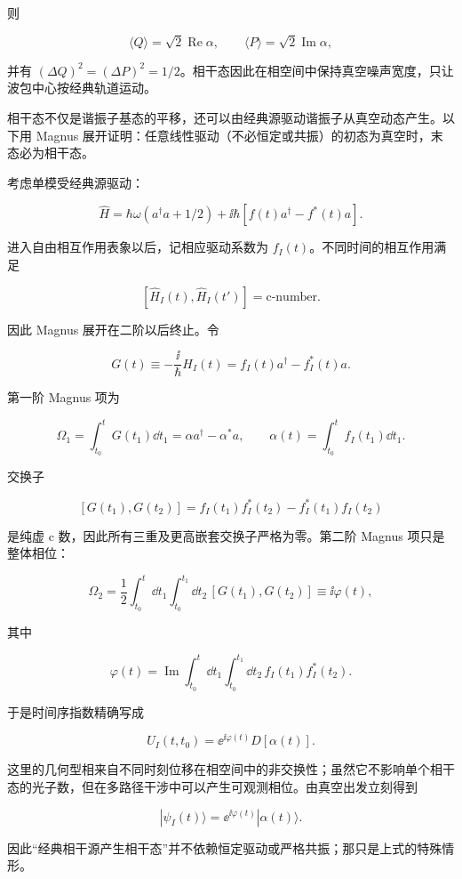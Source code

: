 则

\[
\langle Q\rangle=\sqrt2\operatorname{Re}\alpha,
\qquad
\langle P\rangle=\sqrt2\operatorname{Im}\alpha,
\]

并有 \((\Delta Q)^2=(\Delta P)^2=1/2\)。相干态因此在相空间中保持真空噪声宽度，只让波包中心按经典轨道运动。

相干态不仅是谐振子基态的平移，还可以由经典源驱动谐振子从真空动态产生。以下用 Magnus 展开证明：任意线性驱动（不必恒定或共振）的初态为真空时，末态必为相干态。

考虑单模受经典源驱动：

\[
\hat H
=\hbar\omega(a^\dagger a+1/2)
+\ii\hbar[f(t)a^\dagger-f^*(t)a].
\]

进入自由相互作用表象以后，记相应驱动系数为 \(f_I(t)\)。不同时间的相互作用满足

\[
[\hat H_I(t),\hat H_I(t')]
=\text{c-number}.
\]

因此 Magnus 展开在二阶以后终止。令

\[
G(t)
\equiv-\frac{\ii}{\hbar}H_I(t)
=f_I(t)a^\dagger-f_I^*(t)a.
\]

第一阶 Magnus 项为

\[
\Omega_1
=\int_{t_0}^{t}G(t_1)\dd t_1
=\alpha a^\dagger-\alpha^*a,
\qquad
\alpha(t)=\int_{t_0}^{t}f_I(t_1)\dd t_1.
\]

交换子

\[
[G(t_1),G(t_2)]
=f_I(t_1)f_I^*(t_2)-f_I^*(t_1)f_I(t_2)
\]

是纯虚 c 数，因此所有三重及更高嵌套交换子严格为零。第二阶 Magnus 项只是整体相位：

\[
\Omega_2
=\frac12\int_{t_0}^{t}\dd t_1
\int_{t_0}^{t_1}\dd t_2\,[G(t_1),G(t_2)]
\equiv\ii\varphi(t),
\]

其中

\[
\varphi(t)
=\operatorname{Im}
\int_{t_0}^{t}\dd t_1
\int_{t_0}^{t_1}\dd t_2\,
 f_I(t_1)f_I^*(t_2).
\]

于是时间序指数精确写成

\begin{equation}
U_I(t,t_0)
=\ee^{\ii\varphi(t)}D[\alpha(t)].
\label{eq:driven-oscillator-exact}
\end{equation}

这里的几何型相来自不同时刻位移在相空间中的非交换性；虽然它不影响单个相干态的光子数，但在多路径干涉中可以产生可观测相位。由真空出发立刻得到

\[
|\psi_I(t)\rangle
=\ee^{\ii\varphi(t)}|\alpha(t)\rangle.
\]

因此``经典相干源产生相干态''并不依赖恒定驱动或严格共振；那只是上式的特殊情形。

